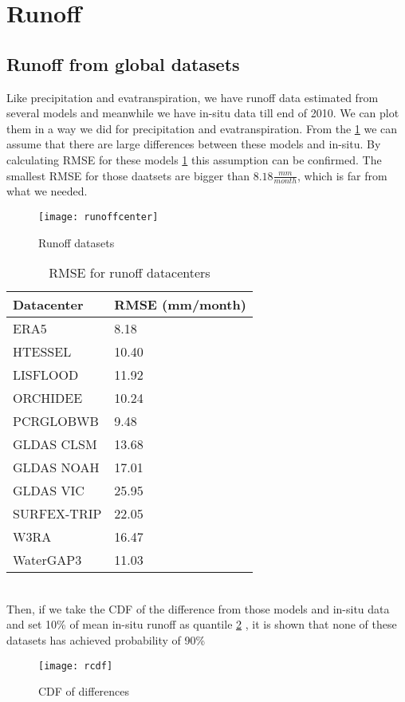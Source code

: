 \section{Runoff}
\subsection{Runoff from global datasets}
Like precipitation and evatranspiration, we have runoff data estimated from several models and meanwhile we have in-situ data till end of 2010. We can plot them in a way we did for precipitation and evatranspiration. From the \ref{fig:rcenter} we can assume that there are large differences between these models and in-situ. By calculating RMSE for these models \ref{tab:rmse} this assumption can be confirmed. The smallest RMSE for those daatsets are bigger than $8.18 \frac{mm}{month}$, which is far from what we needed.
\begin{figure}[htbp]
	\centering
	\texttt{[image: runoffcenter]} %
	\caption{Runoff datasets} 
	\label{fig:rcenter}
\end{figure}
\begin{table}[htbp]\label{tab:rmse} \centering
	\begin{tabular}{|l|l|}
		\hline
		Datacenter  & RMSE (mm/month) \\ \hline
		ERA5        & 8.18  \\ \hline
		HTESSEL     & 10.40 \\ \hline
		LISFLOOD    & 11.92 \\ \hline
		ORCHIDEE    & 10.24 \\ \hline
		PCRGLOBWB   & 9.48  \\ \hline
		GLDAS CLSM  & 13.68 \\ \hline
		GLDAS NOAH  & 17.01 \\ \hline
		GLDAS VIC   & 25.95 \\ \hline
		SURFEX-TRIP & 22.05 \\ \hline
		W3RA        & 16.47 \\ \hline
		WaterGAP3   & 11.03 \\ \hline
	\end{tabular}
	\caption{RMSE for runoff datacenters}
\end{table}\\
Then, if we take the CDF of the difference from those models and in-situ data and set 10\% of mean in-situ runoff as quantile \ref{fig:rcdf} , it is shown that none of these datasets has achieved probability of 90\%
\begin{figure}[htbp]
	\centering
	\texttt{[image: rcdf]} %
	\caption{CDF of differences} 
	\label{fig:rcdf}
\end{figure}\\
